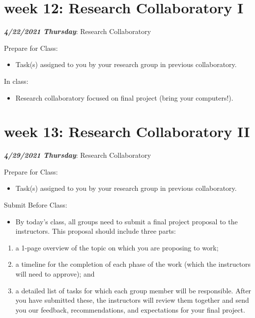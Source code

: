 \documentclass[
]{book}
\providecommand{\tightlist}{%
  \setlength{\itemsep}{0pt}\setlength{\parskip}{0pt}}
\begin{document}
\hypertarget{week-12-research-collaboratory-i-1}{%
\chapter{week 12: Research Collaboratory I}\label{week-12-research-collaboratory-i-1}}

\textbf{\emph{4/22/2021 Thursday}}: Research Collaboratory

Prepare for Class:

\begin{itemize}
\tightlist
\item
  Task(s) assigned to you by your research group in previous collaboratory.
\end{itemize}

In class:

\begin{itemize}
\tightlist
\item
  Research collaboratory focused on final project (bring your computers!).
\end{itemize}

\hypertarget{week-13-research-collaboratory-ii-1}{%
\chapter{week 13: Research Collaboratory II}\label{week-13-research-collaboratory-ii-1}}

\textbf{\emph{4/29/2021 Thursday}}: Research Collaboratory

Prepare for Class:

\begin{itemize}
\tightlist
\item
  Task(s) assigned to you by your research group in previous collaboratory.
\end{itemize}

Submit Before Class:

\begin{itemize}
\tightlist
\item
  By today's class, all groups need to submit a final project proposal to the instructors. This proposal should include three parts:
\end{itemize}

\begin{enumerate}
\def\labelenumi{(\arabic{enumi})}
\tightlist
\item
  a 1-page overview of the topic on which you are proposing to work;
\item
  a timeline for the completion of each phase of the work (which the instructors will need to approve); and
\item
  a detailed list of tasks for which each group member will be responsible. After you have submitted these, the instructors will review them together and send you our feedback, recommendations, and expectations for your final project.
\end{enumerate}
\end{document}

